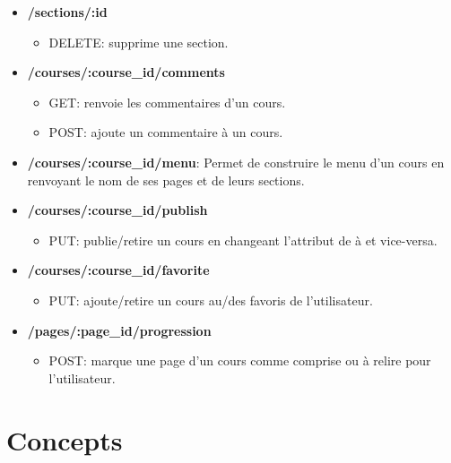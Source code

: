 \documentclass[letterpaper,10pt,oneside]{sphinxmanual}
\begin{document}
\begin{itemize}
\begin{itemize}
\end{itemize}

\item {} 
\textbf{/sections/:id}
\begin{itemize}
\item {} 
DELETE: supprime une section.

\end{itemize}

\item {} 
\textbf{/courses/:course\_id/comments}
\begin{itemize}
\item {} 
GET: renvoie les commentaires d'un cours.

\item {} 
POST: ajoute un commentaire à un cours.

\end{itemize}

\item {} 
\textbf{/courses/:course\_id/menu}: Permet de construire le menu d'un cours en renvoyant le nom de ses pages et de leurs sections.

\item {} 
\textbf{/courses/:course\_id/publish}
\begin{itemize}
\item {} 
PUT: publie/retire un cours en changeant l'attribut  de  à  et vice-versa.

\end{itemize}

\item {} 
\textbf{/courses/:course\_id/favorite}
\begin{itemize}
\item {} 
PUT: ajoute/retire un cours au/des favoris de l'utilisateur.

\end{itemize}

\item {} 
\textbf{/pages/:page\_id/progression}
\begin{itemize}
\item {} 
POST: marque une page d'un cours comme comprise ou à relire pour l'utilisateur.

\end{itemize}

\end{itemize}


\section{Concepts}
\label{guide:concepts}
\end{document}
